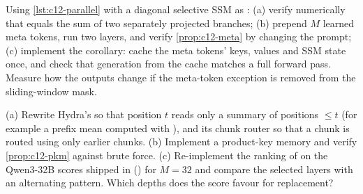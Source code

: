 \begin{exercise}\label{exr:c12-code-parallel}
Using \cref{lst:c12-parallel} with a diagonal selective SSM as : (a) verify numerically
that  equals the sum of two separately projected branches; (b) prepend $M$
learned meta tokens, run two layers, and verify \cref{prop:c12-meta} by changing the prompt; (c)
implement the corollary: cache the meta tokens' keys, values and SSM state once, and check that
generation from the cache matches a full forward pass. Measure how the outputs change if the
meta-token exception is removed from the sliding-window mask.
\end{exercise}

\begin{exercise}\label{exr:c12-code-hydra}
(a) Rewrite Hydra's  so that position $t$ reads only a summary of positions
$\le t$ (for example a prefix mean computed with ), and its chunk router so that a
chunk is routed using only earlier chunks. (b) Implement a product-key memory and verify
\cref{prop:c12-pkm} against brute force. (c) Re-implement the ranking of 
on the Qwen3-32B scores shipped in 
() for $M = 32$ and compare the selected layers with an alternating pattern. Which depths does the
score favour for replacement?
\end{exercise}
